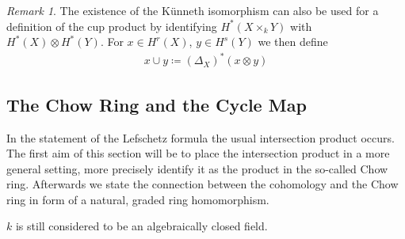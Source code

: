 \documentclass[english]{scrartcl}
\theoremstyle{definition}
\theoremstyle{remark}
\newtheorem{Rem}[Def]{Remark}
\newcommand*{\Diag}[1]{{\Delta_{#1}}} %
\begin{document}
\begin{Rem}
  The existence of the Künneth isomorphism can also be used for
  a definition of the cup product by identifying $H^*(X\times_k Y)$
  with $H^*(X)\otimes H^*(Y)$. For $x\in H^r(X)$, $y\in H^s(Y)$
  we then define
  \begin{gather*}
    x\cup y \coloneqq (\Diag{X})^*(x\otimes y)
  \end{gather*}
\end{Rem}

\subsection{The Chow Ring and the Cycle Map}
In the statement of the Lefschetz formula the usual intersection
product occurs. The first aim of this section will be to place the
intersection product in a more general setting, more precisely
identify it as the product in the so-called Chow ring. Afterwards we
state the connection between the cohomology and the Chow ring in form
of a natural, graded ring homomorphism.

$k$ is still considered to be an algebraically closed field.
\end{document}
